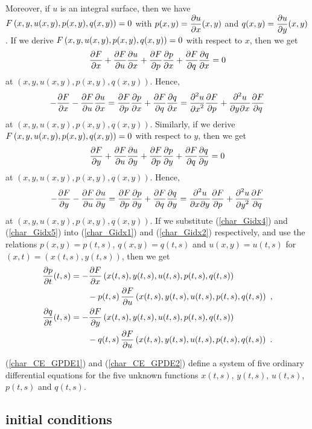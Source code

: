 Moreover, if $u$ is an integral surface, then we have
$\DS F\left(x,y,u(x,y),p(x,y),q(x,y)\right) = 0$ with
$\DS p(x,y) = \pdydx{u}{x}(x,y)$ and
$\DS q(x,y) = \pdydx{u}{y}(x,y)$.  If we derive
$\DS F\left(x,y,u(x,y),p(x,y),q(x,y)\right) = 0$ 
with respect to $x$, then we get
\[
\pdydx{F}{x} + \pdydx{F}{u}\pdydx{u}{x} + \pdydx{F}{p}\pdydx{p}{x}
+ \pdydx{F}{q} \pdydx{q}{x} = 0
\]
at $(x,y,u(x,y),p(x,y),q(x,y))$.  Hence,
\begin{equation} \label{char_Gidx4}
-\pdydx{F}{x} - \pdydx{F}{u}\pdydx{u}{x}
= \pdydx{F}{p}\pdydx{p}{x} + \pdydx{F}{q} \pdydx{q}{x}
= \pdydxn{u}{x}{2} \pdydx{F}{p} + \pdydxnm{u}{y}{x}{2}{}{} \pdydx{F}{q}
\end{equation}
at $(x,y,u(x,y),p(x,y),q(x,y))$.  Similarly, if we derive
$\DS F\left(x,y,u(x,y),p(x,y),q(x,y)\right) = 0$
with respect to $y$, then we get
\[
\pdydx{F}{y} + \pdydx{F}{u}\pdydx{u}{y} + \pdydx{F}{p}\pdydx{p}{y}
+ \pdydx{F}{q} \pdydx{q}{y} = 0
\]
at $(x,y,u(x,y),p(x,y),q(x,y))$.  Hence,
\begin{equation} \label{char_Gidx5}
-\pdydx{F}{y} - \pdydx{F}{u}\pdydx{u}{y}
= \pdydx{F}{p}\pdydx{p}{y} + \pdydx{F}{q} \pdydx{q}{y}
= \pdydxnm{u}{x}{y}{2}{}{} \pdydx{F}{p} + \pdydxn{u}{y}{2}
\pdydx{F}{q}
\end{equation}
at $(x,y,u(x,y),p(x,y),q(x,y))$.  If we substitute (\ref{char_Gidx4})
and (\ref{char_Gidx5}) into (\ref{char_Gidx1}) and (\ref{char_Gidx2})
respectively, and use the relations $p(x,y) = p(t,s)$,
$q(x,y) = q(t,s)$ and $u(x,y) = u(t,s)$ for $(x,t) = (x(t,s), y(t,s))$,
then we get
\begin{equation} \label{char_CE_GPDE2}
\begin{split}
\pdydx{p}{t}(t,s)
&=-\pdydx{F}{x}\left(x(t,s),y(t,s),u(t,s),p(t,s),q(t,s)\right) \\
& \qquad - p(t,s) \,
\pdydx{F}{u}\left(x(t,s),y(t,s),u(t,s),p(t,s),q(t,s)\right) \ , \\
\pdydx{q}{t}(t,s)
&=-\pdydx{F}{y}\left(x(t,s),y(t,s),u(t,s),p(t,s),q(t,s)\right) \\
& \qquad - q(t,s)\,
\pdydx{F}{u}\left(x(t,s),y(t,s),u(t,s),p(t,s),q(t,s)\right) \ .
\end{split}
\end{equation}

(\ref{char_CE_GPDE1}) and (\ref{char_CE_GPDE2}) define a system of five
ordinary differential equations for the five unknown functions
$x(t,s)$, $y(t,s)$, $u(t,s)$, $p(t,s)$ and $q(t,s)$.

\subsection{initial conditions}

